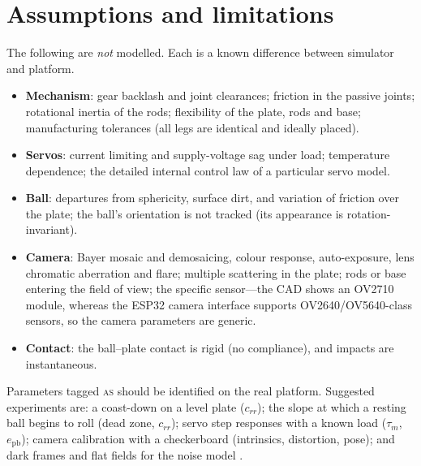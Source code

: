 \documentclass[10pt,a4paper]{article}
\newcommand{\tagAS}{\textsc{as}}
\begin{document}
\section{Assumptions and limitations}\label{sec:limitations}
The following are \emph{not} modelled. Each is a known difference between simulator and
platform.
\begin{itemize}
  \item \textbf{Mechanism}: gear backlash and joint clearances; friction in the passive joints;
        rotational inertia of the rods; flexibility of the plate, rods and base; manufacturing
        tolerances (all legs are identical and ideally placed).
  \item \textbf{Servos}: current limiting and supply-voltage sag under load; temperature
        dependence; the detailed internal control law of a particular servo model.
  \item \textbf{Ball}: departures from sphericity, surface dirt, and variation of friction over
        the plate; the ball's orientation is not tracked (its appearance is rotation-invariant).
  \item \textbf{Camera}: Bayer mosaic and demosaicing, colour response, auto-exposure, lens
        chromatic aberration and flare; multiple scattering in the plate; rods or base entering
        the field of view; the specific sensor---the CAD shows an OV2710 module, whereas the
        ESP32 camera interface supports OV2640/OV5640-class sensors, so the camera parameters are
        generic.
  \item \textbf{Contact}: the ball--plate contact is rigid (no compliance), and impacts are
        instantaneous.
\end{itemize}
Parameters tagged \tagAS{} should be identified on the real platform. Suggested experiments
are: a coast-down on a level plate ($c_{rr}$); the slope at which a resting ball begins to roll
(dead zone, $c_{rr}$); servo step responses with a known load ($\tau_m$, $e_{\mathrm{pb}}$);
camera calibration with a checkerboard \citep{zhang2000flexible} (intrinsics, distortion, pose);
and dark frames and flat fields for the noise model \citep{foi2008practical}.

\appendix
\end{document}
